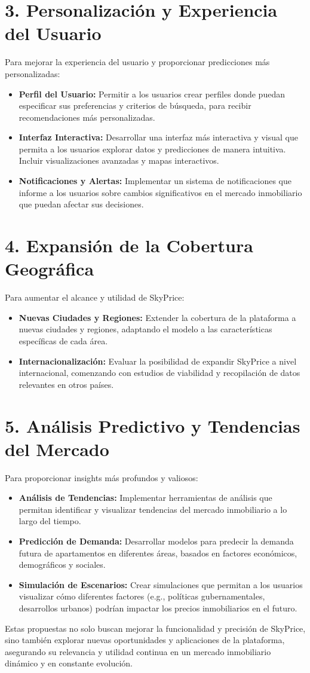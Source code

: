 \section*{3. Personalización y Experiencia del Usuario}
Para mejorar la experiencia del usuario y proporcionar predicciones más personalizadas:
\begin{itemize}
    \item \textbf{Perfil del Usuario:} Permitir a los usuarios crear perfiles donde puedan especificar sus preferencias y criterios de búsqueda, para recibir recomendaciones más personalizadas.
    \item \textbf{Interfaz Interactiva:} Desarrollar una interfaz más interactiva y visual que permita a los usuarios explorar datos y predicciones de manera intuitiva. Incluir visualizaciones avanzadas y mapas interactivos.
    \item \textbf{Notificaciones y Alertas:} Implementar un sistema de notificaciones que informe a los usuarios sobre cambios significativos en el mercado inmobiliario que puedan afectar sus decisiones.
\end{itemize}

\section*{4. Expansión de la Cobertura Geográfica}
Para aumentar el alcance y utilidad de SkyPrice:
\begin{itemize}
    \item \textbf{Nuevas Ciudades y Regiones:} Extender la cobertura de la plataforma a nuevas ciudades y regiones, adaptando el modelo a las características específicas de cada área.
    \item \textbf{Internacionalización:} Evaluar la posibilidad de expandir SkyPrice a nivel internacional, comenzando con estudios de viabilidad y recopilación de datos relevantes en otros países.
\end{itemize}

\section*{5. Análisis Predictivo y Tendencias del Mercado}
Para proporcionar insights más profundos y valiosos:
\begin{itemize}
    \item \textbf{Análisis de Tendencias:} Implementar herramientas de análisis que permitan identificar y visualizar tendencias del mercado inmobiliario a lo largo del tiempo.
    \item \textbf{Predicción de Demanda:} Desarrollar modelos para predecir la demanda futura de apartamentos en diferentes áreas, basados en factores económicos, demográficos y sociales.
    \item \textbf{Simulación de Escenarios:} Crear simulaciones que permitan a los usuarios visualizar cómo diferentes factores (e.g., políticas gubernamentales, desarrollos urbanos) podrían impactar los precios inmobiliarios en el futuro.
\end{itemize}

Estas propuestas no solo buscan mejorar la funcionalidad y precisión de SkyPrice, sino también explorar nuevas oportunidades y aplicaciones de la plataforma, asegurando su relevancia y utilidad continua en un mercado inmobiliario dinámico y en constante evolución.

